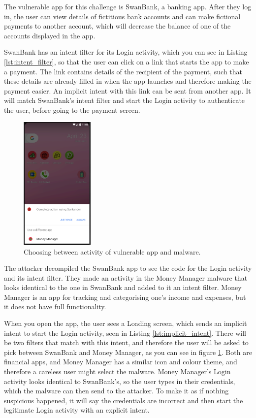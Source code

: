     The vulnerable app for this challenge is SwanBank, a banking app. After they log in, the user can view details of fictitious bank accounts and can make fictional payments to another account, which will decrease the balance of one of the accounts displayed in the app.
    
    SwanBank has an intent filter for its Login activity, which you can see in Listing \ref{lst:intent_filter}, so that the user can click on a link that starts the app to make a payment. The link contains details of the recipient of the payment, such that these details are already filled in when the app launches and therefore making the payment easier. An implicit intent with this link can be sent from another app. It will match SwanBank's intent filter and start the Login activity to authenticate the user, before going to the payment screen.
    
    \begin{figure}
        \centering
        \includegraphics[width=0.32\textwidth]{graphics/activity_hijack.PNG}
        \caption{Choosing between activity of vulnerable app and malware.}
        \label{fig:activity_hijack}
    \end{figure}

    The attacker decompiled the SwanBank app to see the code for the Login activity and its intent filter. They made an activity in the Money Manager malware that looks identical to the one in SwanBank and added to it an intent filter. Money Manager is an app for tracking and categorising one's income and expenses, but it does not have full functionality.
    
    When you open the app, the user sees a Loading screen, which sends an implicit intent to start the Login activity, seen in Listing \ref{lst:implicit_intent}. There will be two filters that match with this intent, and therefore the user will be asked to pick between SwanBank and Money Manager, as you can see in figure \ref{fig:activity_hijack}. Both are financial apps, and Money Manager has a similar icon and colour theme, and therefore a careless user might select the malware. Money Manager's Login activity looks identical to SwanBank's, so the user types in their credentials, which the malware can then send to the attacker. To make it as if nothing suspicious happened, it will say the credentials are incorrect and then start the legitimate Login activity with an explicit intent.
    
